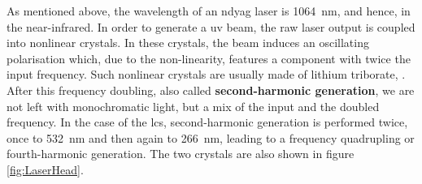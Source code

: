 As mentioned above, the wavelength of an \gls{ndyag} laser is \SI{1064}{\nano\metre}, and hence, in the near-infrared. In order to generate a \gls{uv} beam, the raw laser output is coupled into nonlinear crystals. In these crystals, the beam induces an oscillating polarisation which, due to the non-linearity, features a component with twice the input frequency. Such nonlinear crystals are usually made of lithium triborate,  \cite{LaserBasics1}. After this frequency doubling, also called \textbf{second-harmonic generation}, we are not left with monochromatic light, but a mix of the input and the doubled frequency. In the case of the \gls{lcs}, second-harmonic generation is performed twice, once to \SI{532}{\nano\metre} and then again to \SI{266}{\nano\metre}, leading to a frequency quadrupling or fourth-harmonic generation. The two crystals are also shown in figure \ref{fig:LaserHead}.

